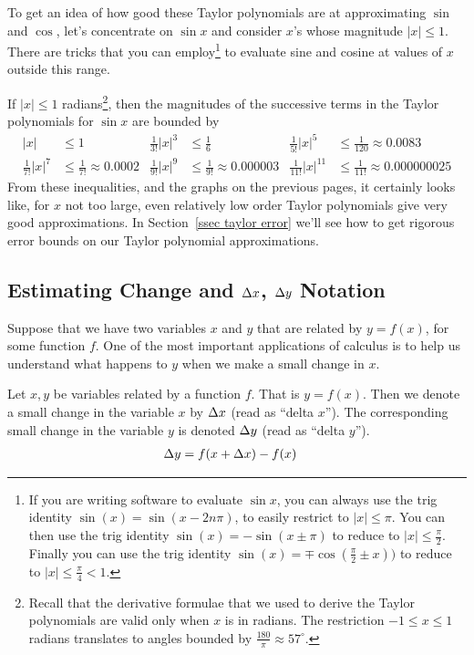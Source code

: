 To get an idea of how good these Taylor polynomials are at approximating $\sin$ and
$\cos$, let's concentrate on $\sin x$ and consider $x$'s whose magnitude $|x|\le 1$.
There are tricks that you can employ\footnote{If you are writing software to evaluate
$\sin x$, you can always use the trig identity $\sin(x)=\sin(x-2n\pi)$, to  easily
restrict to $|x|\le\pi$. You can then use the trig identity $\sin(x)=-\sin(x\pm\pi)$ to
reduce to $|x|\le\tfrac{\pi}{2}$. Finally you can use the trig identity
$\sin(x)=\mp\cos(\tfrac{\pi}{2}\pm x))$ to reduce to $|x|\le\tfrac{\pi}{4} < 1$.} to
evaluate sine and cosine at values of $x$ outside this range.

If $|x|\le 1$ radians\footnote{Recall that the derivative formulae that we used to
derive the Taylor polynomials are valid only when $x$ is in radians. The
restriction $-1 \leq x \leq 1$ radians translates to angles bounded by
$\tfrac{180}{\pi}\approx 57^\circ$.}, then the magnitudes of the successive
terms in the Taylor polynomials for $\sin x$ are bounded by
\begin{align*}
|x|&\le 1 &
\tfrac{1}{3!}|x|^3&\le\tfrac{1}{6} &
\tfrac{1}{5!}|x|^5&\le\tfrac{1}{120}\approx 0.0083 \\
\tfrac{1}{7!}|x|^7&\le\tfrac{1}{7!}\approx 0.0002 &
\tfrac{1}{9!}|x|^9&\le\tfrac{1}{9!}\approx 0.000003 &
\tfrac{1}{11!}|x|^{11}&\le\tfrac{1}{11!}\approx 0.000000025
\end{align*}
From these inequalities, and the graphs on the previous pages, it certainly looks like,
for $x$ not too large, even relatively low order Taylor polynomials give very good
approximations. In Section~\ref{ssec taylor error} we'll see how to get rigorous error
bounds on our Taylor polynomial approximations.




\subsection{Estimating Change and $\Delta x$, $\Delta y$ Notation}
\label{ssec_est_change}


Suppose that we have two variables $x$ and $y$ that are related by $y=f(x)$, for some
function $f$. One of the most important applications of calculus is to help us understand
what happens to $y$ when we make a small change in $x$.

\begin{notn}\label{ntn_3_4_2}
 Let $x,y$ be variables related by a function $f$. That is $y = f(x)$. Then we denote a
  small change in the variable $x$ by $\Delta x$ (read as ``delta $x$''). The corresponding
small change in the variable $y$ is denoted $\Delta y$ (read as ``delta $y$'').
\begin{align*}
  \Delta y &= f(x+\Delta x) - f(x)
\end{align*}
\end{notn}

